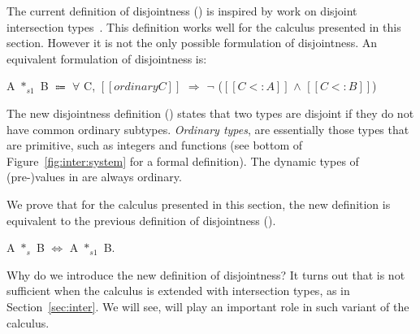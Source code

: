 The current definition of disjointness () is inspired
by work on disjoint intersection types~\cite{oliveira2016disjoint}. This definition works well
for the calculus presented in this section. However it is not the only
possible formulation of disjointness.
An equivalent formulation of disjointness is:

\begin{definition}
    A $*_{s1}$ B $\Coloneqq$ $\forall$ C, $[[ordinary C]]$ $\Longrightarrow$ $\neg$ ($[[C <: A]]$ $\wedge$ $[[C <: B]]$)
    \label{def:union:disj1}
  \end{definition}

\noindent
The new disjointness definition () states that two
types are disjoint if they do not have common ordinary subtypes.
\emph{Ordinary types}, are essentially
those types that are primitive, such as integers and functions (see bottom
of Figure~\ref{fig:inter:system} for a formal definition).
The dynamic types of (pre-)values in \name are always ordinary.

We prove that for the calculus presented in this section, the new definition is
equivalent to the previous definition of disjointness
().

\begin{lemma}
A $*_{s}$ B $\Longleftrightarrow$ A $*_{s1}$ B.
\end{lemma}

\noindent Why do we introduce the new definition of disjointness? It turns out that
 is not sufficient when the calculus is extended with
intersection types, as in Section~\ref{sec:inter}. We will see,
 will play an important role in such variant of the calculus.

